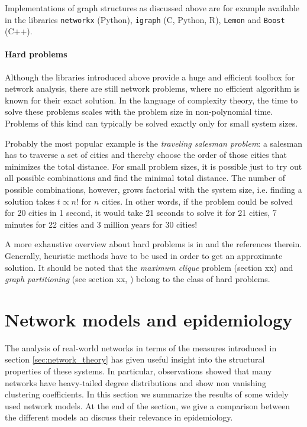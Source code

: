 \documentclass[openright,twoside,headsepline]{scrbook}
\begin{document}
Implementations of graph structures as discussed above are for example available in the libraries \verb"networkx" (Python), \verb"igraph" (C, Python, R), \verb"Lemon" and \verb"Boost" (C++).

\paragraph{Hard problems\color{Cayenne}{.}}
Although the libraries introduced above provide a huge and efficient toolbox for network analysis, there are still network problems, where no efficient algorithm is known for their exact solution.
In the language of complexity theory, the time to solve these problems scales with the problem size in non-polynomial time.
Problems of this kind can typically be solved exactly only for small system sizes.

Probably the most popular example is the \emph{traveling salesman problem}: a salesman has to traverse a set of cities and thereby choose the order of those cities that minimizes the total distance.
For small problem sizes, it is possible just to try out all possible combinations and find the minimal total distance.
The number of possible combinations, however, grows factorial with the system size, i.e. finding a solution takes $t\propto n!$ for $n$ cities.
In other words, if the problem could be solved for 20 cities in 1 second, it would take 21 seconds to solve it for 21 cities, 7 minutes for 22 cities and 3 million years for 30 cities!

A more exhaustive overview about hard problems is in \citep{algorithm_design} and the references therein.
Generally, heuristic methods have to be used in order to get an approximate solution.
It should be noted that the \emph{maximum clique} problem (section xx) and \emph{graph partitioning} (see section xx, \citep{brandes2007}) belong to the class of hard problems.


\section{Network models and epidemiology}\label{sec:network_models}
The analysis of real-world networks in terms of the measures introduced in section \ref{sec:network_theory} has given useful insight into the structural properties of these systems.
In particular, observations showed that many networks have heavy-tailed degree distributions and show non vanishing clustering coefficients.
In this section we summarize the results of some widely used network models.
At the end of the section, we give a comparison between the different models an discuss their relevance in epidemiology.
\end{document}
